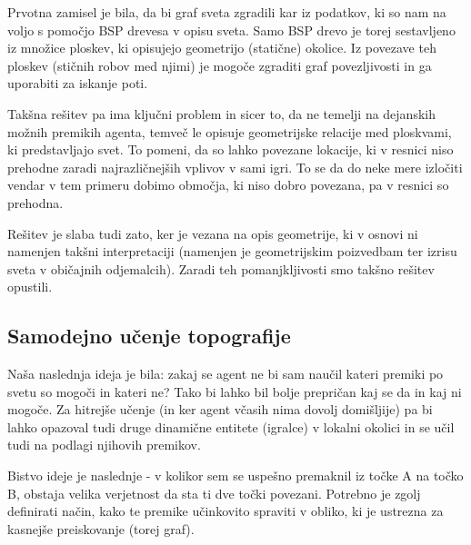 \documentclass[a4paper,10pt]{article}
\begin{document}
Prvotna zamisel je bila, da bi graf sveta zgradili kar iz podatkov, ki so nam na voljo s pomočjo BSP drevesa v opisu sveta. Samo BSP drevo je torej sestavljeno iz množice ploskev, ki opisujejo geometrijo (statične) okolice. Iz povezave teh ploskev (stičnih robov med njimi) je mogoče zgraditi graf povezljivosti in ga uporabiti za iskanje poti.

Takšna rešitev pa ima ključni problem in sicer to, da ne temelji na dejanskih možnih premikih agenta, temveč le opisuje geometrijske relacije med ploskvami, ki predstavljajo svet. To pomeni, da so lahko povezane lokacije, ki v resnici niso prehodne zaradi najrazličnejših vplivov v sami igri. To se da do neke mere izločiti vendar v tem primeru dobimo območja, ki niso dobro povezana, pa v resnici so prehodna.

Rešitev je slaba tudi zato, ker je vezana na opis geometrije, ki v osnovi ni namenjen takšni interpretaciji (namenjen je geometrijskim poizvedbam ter izrisu sveta v običajnih odjemalcih). Zaradi teh pomanjkljivosti smo takšno rešitev opustili.

\subsection{Samodejno učenje topografije}

Naša naslednja ideja je bila: zakaj se agent ne bi sam naučil kateri premiki po svetu so mogoči in kateri ne? Tako bi lahko bil bolje prepričan kaj se da in kaj ni mogoče. Za hitrejše učenje (in ker agent včasih nima dovolj domišljije) pa bi lahko opazoval tudi druge dinamične entitete (igralce) v lokalni okolici in se učil tudi na podlagi njihovih premikov.

Bistvo ideje je naslednje - v kolikor sem se uspešno premaknil iz točke A na točko B, obstaja velika verjetnost da sta ti dve točki povezani. Potrebno je zgolj definirati način, kako te premike učinkovito spraviti v obliko, ki je ustrezna za kasnejše preiskovanje (torej graf).
\end{document}
